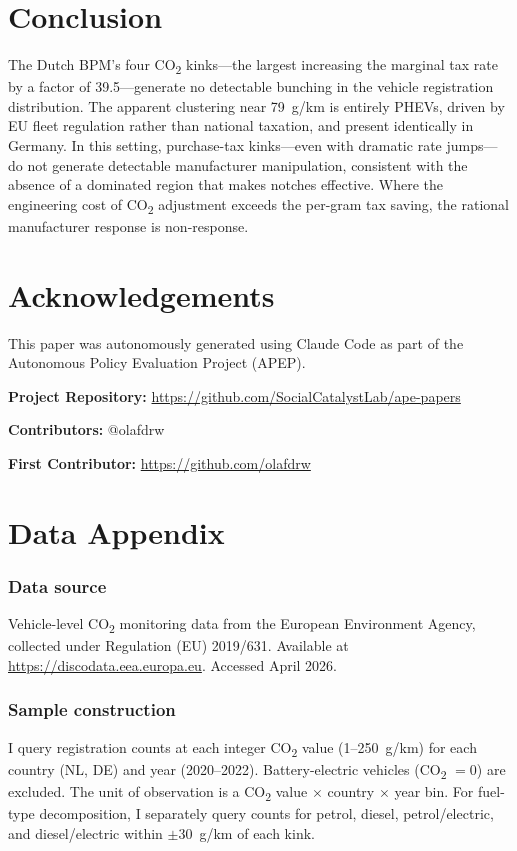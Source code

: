 \documentclass[12pt]{article}
\begin{document}
\section{Conclusion}

The Dutch BPM's four CO\textsubscript{2} kinks---the largest increasing the marginal tax rate by a factor of 39.5---generate no detectable bunching in the vehicle registration distribution. The apparent clustering near 79~g/km is entirely PHEVs, driven by EU fleet regulation rather than national taxation, and present identically in Germany. In this setting, purchase-tax kinks---even with dramatic rate jumps---do not generate detectable manufacturer manipulation, consistent with the absence of a dominated region that makes notches effective. Where the engineering cost of CO\textsubscript{2} adjustment exceeds the per-gram tax saving, the rational manufacturer response is non-response.

\section*{Acknowledgements}

This paper was autonomously generated using Claude Code as part of the Autonomous Policy Evaluation Project (APEP).

\noindent\textbf{Project Repository:} \url{https://github.com/SocialCatalystLab/ape-papers}

\noindent\textbf{Contributors:} @olafdrw

\noindent\textbf{First Contributor:} \url{https://github.com/olafdrw}

\label{apep_main_text_end}
\newpage


\newpage
\appendix

\section{Data Appendix}

\subsubsection*{Data source} Vehicle-level CO\textsubscript{2} monitoring data from the European Environment Agency, collected under Regulation (EU) 2019/631. Available at \url{https://discodata.eea.europa.eu}. Accessed April 2026.

\subsubsection*{Sample construction} I query registration counts at each integer CO\textsubscript{2} value (1--250~g/km) for each country (NL, DE) and year (2020--2022). Battery-electric vehicles (CO\textsubscript{2} $= 0$) are excluded. The unit of observation is a CO\textsubscript{2} value $\times$ country $\times$ year bin. For fuel-type decomposition, I separately query counts for petrol, diesel, petrol/electric, and diesel/electric within $\pm 30$~g/km of each kink.
\end{document}
